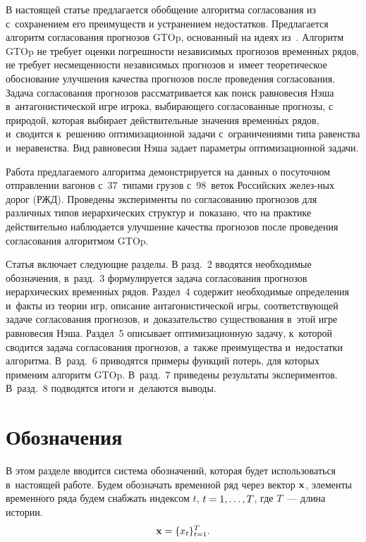 \begin{multicols}{2}
В настоящей статье предлагается обобщение алгоритма согласования
из~\cite{stenina2014reconciliation} с~сохранением его преимуществ
и устранением недостатков. Предлагается алгоритм согласования
прогнозов GTOp,
основанный на идеях из~\cite{vanerven:hal-00920559}. Алгоритм GTOp
не требует оценки погрешности независимых прогнозов временн$\acute{\mbox{ы}}$х
рядов, не требует не\-сме\-щен\-ности независимых прогнозов и~имеет
теоретическое обоснование улучшения качества прогнозов после
проведения согласования. Задача согласования прогнозов
рассматривается как поиск равновесия
Нэша~\cite{petrosyan1998theory, menshikov2010lections}
в~антагонистической игре игрока, выбирающего согласованные прогнозы,
с природой, которая выбирает действительные значения временн$\acute{\mbox{ы}}$х
рядов, и~сводится к~решению оптимизационной задачи с~ограничениями
типа равенства и~неравенства. Вид равновесия Нэша задает параметры
оптимизационной задачи.

Работа предлагаемого алгоритма демонстрируется на данных о
посуточном отправлении вагонов с~37~типами грузов с~98~веток
Российских желез-\linebreak ных дорог (РЖД).
Проведены эксперименты по согласова\-нию прогнозов для различных
типов иерархических структур и~показано, что на практике
действительно наблюдается улучшение качества прогнозов после
проведения согласования алгоритмом GTOp.

Статья включает следующие разделы. В разд.~2 вводятся необходимые
обозначения, в~разд.~3 формулируется задача согласования прогнозов
иерархических временн$\acute{\mbox{ы}}$х рядов. Раздел~4 содержит  необходимые
определения и~факты из теории игр, описание антагонистической
игры, со\-от\-вет\-ст\-ву\-ющей задаче согласования прогнозов, и~доказательство существования в~этой игре равновесия Нэша. Раздел~5
 описывает оптимизационную задачу, к~которой сводится задача
согласования прогнозов, а~также преимущества и~недостатки
алгоритма. В~разд.~6 приводятся примеры функций потерь, для
которых применим алгоритм GTOp. В~разд.~7 приведены результаты
экспериментов. В~разд.~8 подводятся итоги и~делаются выводы.



\section{Обозначения}

В этом разделе вводится система обозначений, которая будет
использоваться в~настоящей работе. Будем обозначать временной ряд
через вектор $\mathbf{x}$, элементы временн$\acute{\mbox{о}}$го ряда будем снабжать
индексом $t$, $t \hm= 1, \ldots, T$,
 где $T$~--- длина истории.
$$
    \mathbf{x} = \{ x_t \}_{t = 1}^T.
$$


\end{multicols}
